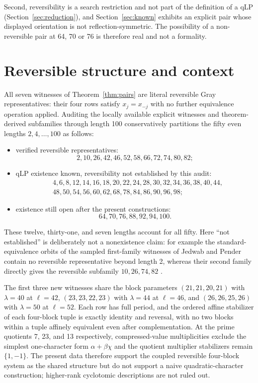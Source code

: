 \documentclass[11pt]{article}
\begin{document}
Second, reversibility is a search restriction and not part of the definition of
a qLP (Section~\ref{sec:reduction}), and Section~\ref{sec:known} exhibits an
explicit pair whose displayed orientation is not reflection-symmetric.  The
possibility of a non-reversible pair at 64, 70 or 76 is therefore real and not
a formality.

\section{Reversible structure and context}
\label{sec:structure}

All seven witnesses of Theorem~\ref{thm:pairs} are literal reversible Gray
representatives: their four rows satisfy $x_j=x_{-j}$ with no further
equivalence operation applied.  Auditing the locally available explicit
witnesses and theorem-derived subfamilies through length 100 conservatively
partitions the fifty even lengths $2,4,\dots,100$ as follows:
\begin{itemize}
  \item verified reversible representatives:
  \[
    2,10,26,42,46,52,58,66,72,74,80,82;
  \]
  \item qLP existence known, reversibility not established by this audit:
  \[
  \begin{split}
    &4,6,8,12,14,16,18,20,22,24,28,30,32,34,36,38,40,44,\\
    &48,50,54,56,60,62,68,78,84,86,90,96,98;
  \end{split}
  \]
  \item existence still open after the present constructions:
  \[
    64,70,76,88,92,94,100.
  \]
\end{itemize}
These twelve, thirty-one, and seven lengths account for all fifty.  Here
``not established'' is deliberately not a nonexistence claim: for example the
standard-equivalence orbits of the sampled first-family witnesses of Jedwab
and Pender contain no reversible representative beyond length 2, whereas their
second family directly gives the reversible subfamily $10,26,74,82$
\cite{jedwab-pender-2025}.

The first three new witnesses share the block parameters
$(21,21,20,21)$ with $\lambda=40$ at $\ell=42$, $(23,23,22,23)$ with
$\lambda=44$ at $\ell=46$, and $(26,26,25,26)$ with $\lambda=50$ at
$\ell=52$.  Each row has full period, and the ordered affine stabilizer of
each four-block tuple is exactly identity and reversal, with no two blocks
within a tuple affinely equivalent even after complementation.  At the prime
quotients 7, 23, and 13 respectively, compressed-value multiplicities exclude
the simplest one-character form $\alpha+\beta\chi$ and the quotient multiplier
stabilizers remain $\{1,-1\}$.  The present data therefore support the coupled
reversible four-block system as the shared structure but do not support a
naive quadratic-character construction; higher-rank cyclotomic descriptions
are not ruled out.
\end{document}
